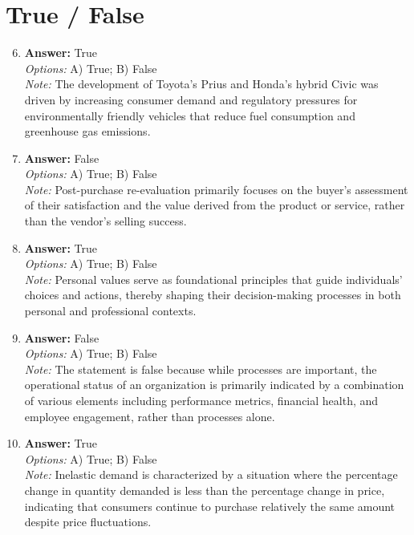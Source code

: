 \documentclass[12pt]{article}
\begin{document}
\section*{True / False}
\begin{enumerate}[label=\arabic*.]
\setcounter{enumi}{5}
\item \textbf{Answer:} True
\\ \textit{Options:} A) True; B) False
\\ \textit{Note:} The development of Toyota's Prius and Honda's hybrid Civic was driven by increasing consumer demand and regulatory pressures for environmentally friendly vehicles that reduce fuel consumption and greenhouse gas emissions.
\item \textbf{Answer:} False
\\ \textit{Options:} A) True; B) False
\\ \textit{Note:} Post-purchase re-evaluation primarily focuses on the buyer's assessment of their satisfaction and the value derived from the product or service, rather than the vendor's selling success.
\item \textbf{Answer:} True
\\ \textit{Options:} A) True; B) False
\\ \textit{Note:} Personal values serve as foundational principles that guide individuals' choices and actions, thereby shaping their decision-making processes in both personal and professional contexts.
\item \textbf{Answer:} False
\\ \textit{Options:} A) True; B) False
\\ \textit{Note:} The statement is false because while processes are important, the operational status of an organization is primarily indicated by a combination of various elements including performance metrics, financial health, and employee engagement, rather than processes alone.
\item \textbf{Answer:} True
\\ \textit{Options:} A) True; B) False
\\ \textit{Note:} Inelastic demand is characterized by a situation where the percentage change in quantity demanded is less than the percentage change in price, indicating that consumers continue to purchase relatively the same amount despite price fluctuations.
\end{enumerate}
\end{document}
